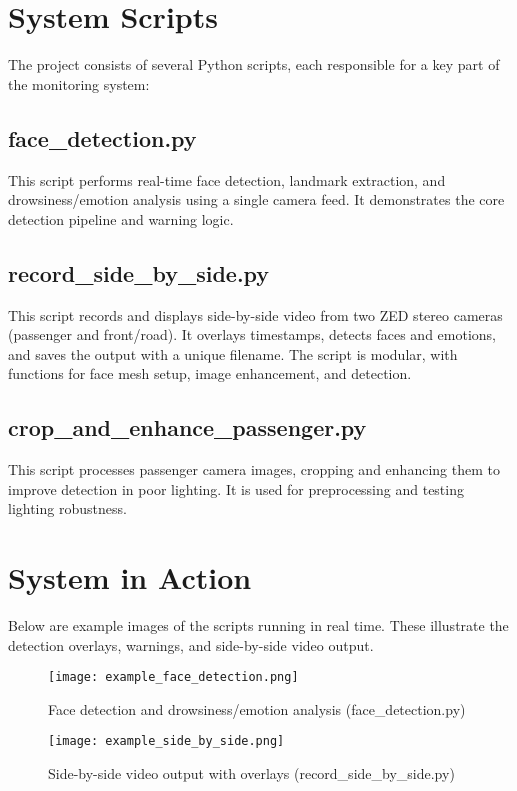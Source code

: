 \documentclass[12pt]{article}
\begin{document}
\section{System Scripts}
The project consists of several Python scripts, each responsible for a key part of the monitoring system:

\subsection{face\_detection.py}
This script performs real-time face detection, landmark extraction, and drowsiness/emotion analysis using a single camera feed. It demonstrates the core detection pipeline and warning logic.

\subsection{record\_side\_by\_side.py}
This script records and displays side-by-side video from two ZED stereo cameras (passenger and front/road). It overlays timestamps, detects faces and emotions, and saves the output with a unique filename. The script is modular, with functions for face mesh setup, image enhancement, and detection.

\subsection{crop\_and\_enhance\_passenger.py}
This script processes passenger camera images, cropping and enhancing them to improve detection in poor lighting. It is used for preprocessing and testing lighting robustness.

\section{System in Action}
Below are example images of the scripts running in real time. These illustrate the detection overlays, warnings, and side-by-side video output.

\begin{figure}[h!]
    \centering
    \texttt{[image: example\_face\_detection.png]}
    \caption{Face detection and drowsiness/emotion analysis (face\_detection.py)}
\end{figure}

\begin{figure}[h!]
    \centering
    \texttt{[image: example\_side\_by\_side.png]}
    \caption{Side-by-side video output with overlays (record\_side\_by\_side.py)}
\end{figure}
\end{document}
